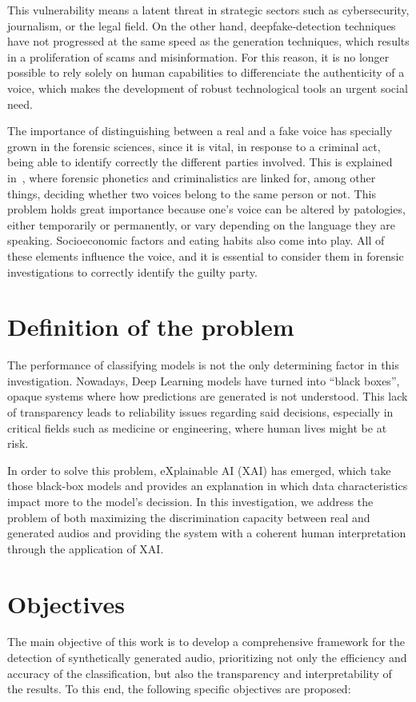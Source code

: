 This vulnerability means a latent threat in strategic sectors such as cybersecurity, journalism, or the legal field. On the other hand, deepfake-detection techniques have not progressed at the same speed as the generation techniques, which results in a proliferation of scams and misinformation. For this reason, it is no longer possible to rely solely on human capabilities to differenciate the authenticity of a voice, which makes the development of robust technological tools an urgent social need.

The importance of distinguishing between a real and a fake voice has specially grown in the forensic sciences, since it is vital, in response to a criminal act, being able to identify correctly the different parties involved. This is explained in~\parencite{Peña2024}, where forensic phonetics and criminalistics are linked for, among other things, deciding whether two voices belong to the same person or not. This problem holds great importance because one's voice can be altered by patologies, either temporarily or permanently, or vary depending on the language they are speaking. Socioeconomic factors and eating habits also come into play. All of these elements influence the voice, and it is essential to consider them in forensic investigations to correctly identify the guilty party.

\section*{Definition of the problem}
The performance of classifying models is not the only determining factor in this investigation. Nowadays, Deep Learning models have turned into ``black boxes'', opaque systems where how predictions are generated is not understood. This lack of transparency leads to reliability issues regarding said decisions, especially in critical fields such as medicine or engineering, where human lives might be at risk.

In order to solve this problem, eXplainable AI (XAI) has emerged, which take those black-box models and provides an explanation in which data characteristics impact more to the model's decission. In this investigation, we address the problem of both maximizing the discrimination capacity between real and generated audios and providing the system with a coherent human interpretation through the application of XAI.

\section*{Objectives}
The main objective of this work is to develop a comprehensive framework for the detection of synthetically generated audio, prioritizing not only the efficiency and accuracy of the classification, but also the transparency and interpretability of the results. To this end, the following specific objectives are proposed:

